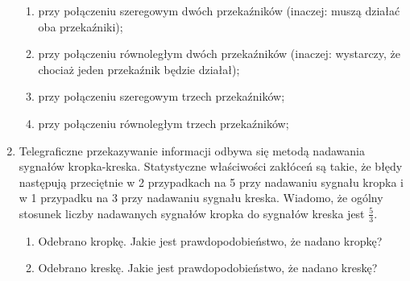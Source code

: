 \documentclass{mwart}
\newcommand{\ans}[1]{}
\newcommand{\ans}[1]{\emph{Odpowiedź:} #1}
\begin{document}
\begin{enumerate}
\begin{enumerate}
\item przy połączeniu szeregowym dwóch przekaźników (inaczej: muszą działać oba przekaźniki);
\item przy połączeniu równoległym dwóch przekaźników (inaczej: wystarczy, że chociaż jeden przekaźnik będzie działał);
\item przy połączeniu szeregowym trzech przekaźników;
\item przy połączeniu równoległym trzech przekaźników;
\end{enumerate}
\item Telegraficzne przekazywanie informacji odbywa się metodą nadawania
sygnałów kropka-kreska. Statystyczne właściwości zakłóceń są takie, że błędy
następują przeciętnie w 2 przypadkach na 5 przy nadawaniu sygnału kropka i w 1
przypadku na 3 przy nadawaniu sygnału kreska. Wiadomo, że ogólny stosunek
liczby nadawanych sygnałów kropka do sygnałów kreska jest $\frac{5}{3}$.
\begin{enumerate}
\item Odebrano kropkę. Jakie jest prawdopodobieństwo, że nadano kropkę? \ans{$P(N_\cdot|O_\cdot)=\frac{P(O_\cdot|N_\cdot)P(N_\cdot)}{P(O_\cdot|N_\cdot)P(N_\cdot)+P(O_\cdot|N_-)P(N_-)}=\frac{\frac{3}{5}\frac{5}{8}}{\frac{3}{5}\frac{5}{8}+\frac{1}{3}\frac{3}{8}}=\frac{3}{4}$}
\item Odebrano kreskę. Jakie jest prawdopodobieństwo, że nadano kreskę?
\end{enumerate}


\end{enumerate}
\end{document}
